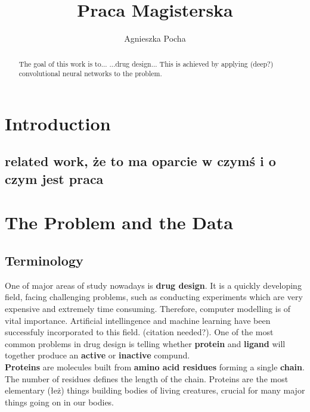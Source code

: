 \documentclass[a4paper,10pt]{report}
\title{Praca Magisterska}
\author{Agnieszka Pocha}
\begin{document}
  \maketitle
  \begin{abstract}
    The goal of this work is to... ...drug design... This is achieved by applying (deep?) convolutional neural networks to the problem.
  \end{abstract}
  \tableofcontents
  
  
  \chapter{Introduction} %
    \section{related work, że to ma oparcie w czymś i o czym jest praca}
  
  \chapter{The Problem and the Data}
    
    \section{Terminology} %
    One of major areas of study nowadays is \textbf{drug design}. It is a quickly developing field, facing challenging problems, such as conducting experiments which are very expensive and extremely time consuming. Therefore, computer modelling is of vital importance. Artificial intellingence and machine learning have been successfuly incorporated to this field. (citation needed?). One of the most common problems in drug design is telling whether \textbf{protein} and \textbf{ligand} will together produce an \textbf{active} or \textbf{inactive} compund.\\
    
    \textbf{Proteins} are molecules built from \textbf{amino acid residues} forming a single \textbf{chain}. The number of residues defines the length of the chain. Proteins are the most elementary (łeż) things building bodies of living creatures, crucial for many major things going on in our bodies.\\
    
\end{document}
